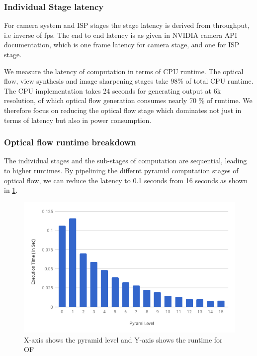 \subsubsection{Individual Stage latency}


For camera system and ISP stages the stage latency is derived from throughput, i.e inverse of fps. The end to end latency is as given in NVIDIA camera API documentation, which is one frame latency for camera stage, and one for ISP stage. 

We measure the latency of computation in terms of CPU runtime. The optical flow, view synthesis and image sharpening stages take 98\% of total CPU runtime. The CPU  implementation takes 24 seconds for generating output at 6k resolution, of which optical flow generation consumes nearly 70 \% of runtime. We therefore focus on reducing the optical flow stage which dominates not just in terms of latency but also in power consumption. 


\subsubsection{Optical flow runtime breakdown}
The individual stages and the sub-stages of computation are sequential, leading to higher runtimes. By pipelining the differnt pyramid computation stages of optical flow, we can reduce the latency to 0.1 seconds from 16 seconds as shown in \ref{fig:OF_pyr_runtime}.

\begin{figure}[h]
	\begin{center}
		\includegraphics[width=1\textwidth]{data/images/pyramid_runtime.png}

	\end{center}
		\caption{X-axis shows the pyramid level and Y-axis shows the runtime for OF}
\label{fig:OF_pyr_runtime}
\end{figure} 


